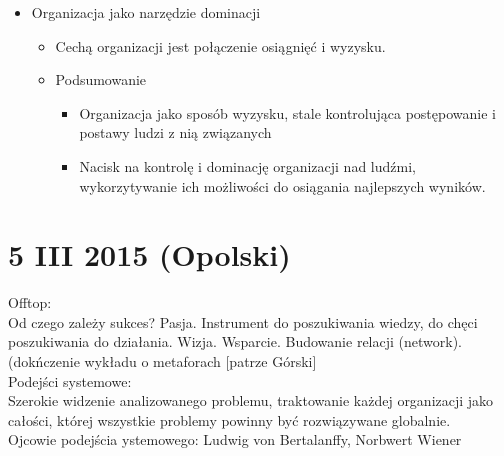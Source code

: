 \documentclass[a4paper,10pt]{report}
\begin{document}
\begin{itemize}
	\item Organizacja jako narzędzie dominacji
	\begin{itemize}
		\item Cechą organizacji jest połączenie osiągnięć i wyzysku.
		\item Podsumowanie
		\begin{itemize}
			\item Organizacja jako sposób wyzysku, stale kontrolująca postępowanie i postawy ludzi z nią związanych
			\item Nacisk na kontrolę i dominację organizacji nad ludźmi, wykorzytywanie ich możliwości do osiągania najlepszych wyników.
		\end{itemize}
	\end{itemize}
\end{itemize}

\section{5 III 2015 (Opolski)}

Offtop: \\
Od czego zależy sukces? Pasja. Instrument do poszukiwania wiedzy, do chęci poszukiwania do działania. Wizja. Wsparcie. Budowanie relacji (network). \\

(dokńczenie wykładu o metaforach [patrze Górski]\\

Podejści systemowe:\\
Szerokie widzenie analizowanego problemu, traktowanie każdej organizacji jako całości, której wszystkie problemy powinny być rozwiązywane globalnie.\\

Ojcowie podejścia ystemowego: Ludwig von Bertalanffy, Norbwert Wiener\\
\end{document}
